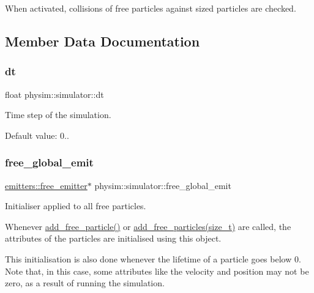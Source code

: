 When activated, collisions of free particles against sized particles are checked. 

\subsection{Member Data Documentation}
\mbox{\label{classphysim_1_1simulator_a12a60d0ed819937b51ce50162dbdd6e1}} 
\subsubsection{\texorpdfstring{dt}{dt}}
{\footnotesize\ttfamily float physim\+::simulator\+::dt\hspace{0.3cm}{\ttfamily [private]}}



Time step of the simulation. 

Default value\+: 0.. \mbox{\label{classphysim_1_1simulator_a05e2840fc39c644d7005ea938e63202f}} 
\subsubsection{\texorpdfstring{free\+\_\+global\+\_\+emit}{free\_global\_emit}}
{\footnotesize\ttfamily \hyperlink{classphysim_1_1emitters_1_1free__emitter}{emitters\+::free\+\_\+emitter}$\ast$ physim\+::simulator\+::free\+\_\+global\+\_\+emit\hspace{0.3cm}{\ttfamily [private]}}



Initialiser applied to all free particles. 

Whenever \hyperlink{classphysim_1_1simulator_a6d2b636673f895b006724a6ba310e322}{add\+\_\+free\+\_\+particle()} or \hyperlink{classphysim_1_1simulator_a8729cd8c3590730d8897f61f2320f3e8}{add\+\_\+free\+\_\+particles(size\+\_\+t)} are called, the attributes of the particles are initialised using this object.

This initialisation is also done whenever the lifetime of a particle goes below 0. Note that, in this case, some attributes like the velocity and position may not be zero, as a result of running the simulation.


